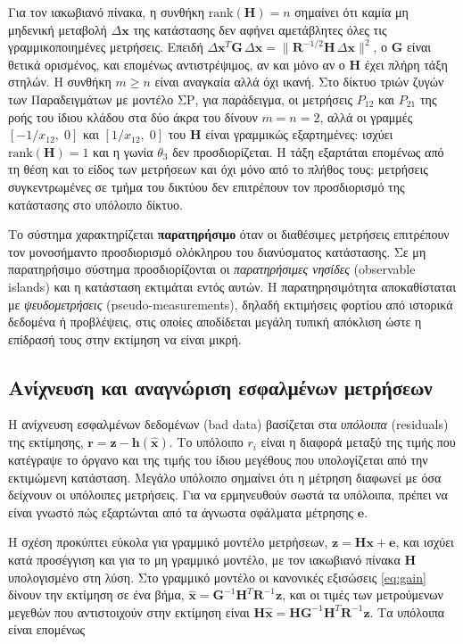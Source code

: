 Για τον ιακωβιανό πίνακα, η συνθήκη $\mathrm{rank}(\mathbf{H}) = n$ σημαίνει ότι καμία μη μηδενική
μεταβολή $\Delta\mathbf{x}$ της κατάστασης δεν αφήνει αμετάβλητες όλες τις γραμμικοποιημένες
μετρήσεις. Επειδή
$\Delta\mathbf{x}^{T}\mathbf{G}\,\Delta\mathbf{x} = \|\mathbf{R}^{-1/2}\mathbf{H}\,\Delta\mathbf{x}\|^{2}$,
ο $\mathbf{G}$ είναι θετικά ορισμένος, και επομένως αντιστρέψιμος, αν και μόνο αν ο
$\mathbf{H}$ έχει πλήρη τάξη στηλών. Η συνθήκη $m \ge n$ είναι αναγκαία αλλά όχι ικανή. Στο
δίκτυο τριών ζυγών των Παραδειγμάτων με μοντέλο ΣΡ, για παράδειγμα, οι μετρήσεις $P_{12}$ και
$P_{21}$ της ροής του ίδιου κλάδου στα δύο άκρα του δίνουν $m = n = 2$, αλλά οι γραμμές
$[-1/x_{12},\; 0]$ και $[1/x_{12},\; 0]$ του $\mathbf{H}$ είναι γραμμικώς εξαρτημένες: ισχύει
$\mathrm{rank}(\mathbf{H}) = 1$ και η γωνία $\theta_3$ δεν προσδιορίζεται. Η τάξη εξαρτάται
επομένως από τη θέση και το είδος των μετρήσεων και όχι μόνο από το πλήθος τους: μετρήσεις
συγκεντρωμένες σε τμήμα του δικτύου δεν επιτρέπουν τον προσδιορισμό της κατάστασης στο
υπόλοιπο δίκτυο.

Το σύστημα χαρακτηρίζεται \textbf{παρατηρήσιμο} όταν οι διαθέσιμες μετρήσεις επιτρέπουν τον
μονοσήμαντο προσδιορισμό ολόκληρου του διανύσματος κατάστασης. Σε μη παρατηρήσιμο σύστημα προσδιορίζονται οι
\emph{παρατηρήσιμες νησίδες} (observable islands) και η κατάσταση εκτιμάται εντός αυτών. Η
παρατηρησιμότητα αποκαθίσταται με \emph{ψευδομετρήσεις} (pseudo-measurements), δηλαδή
εκτιμήσεις φορτίου από ιστορικά δεδομένα ή προβλέψεις, στις οποίες αποδίδεται μεγάλη τυπική
απόκλιση ώστε η επίδρασή τους στην εκτίμηση να είναι μικρή.

\subsection{Ανίχνευση και αναγνώριση εσφαλμένων μετρήσεων}
\label{sec:baddata}

Η ανίχνευση εσφαλμένων δεδομένων (bad data) βασίζεται στα \emph{υπόλοιπα} (residuals) της
εκτίμησης, $\mathbf{r} = \mathbf{z}-\mathbf{h}(\hat{\mathbf{x}})$. Το υπόλοιπο $r_i$ είναι η
διαφορά μεταξύ της τιμής που κατέγραψε το όργανο και της τιμής του ίδιου μεγέθους που
υπολογίζεται από την εκτιμώμενη κατάσταση. Μεγάλο υπόλοιπο σημαίνει ότι η μέτρηση διαφωνεί με
όσα δείχνουν οι υπόλοιπες μετρήσεις. Για να ερμηνευθούν σωστά τα υπόλοιπα, πρέπει να είναι
γνωστό πώς εξαρτώνται από τα άγνωστα σφάλματα μέτρησης $\mathbf{e}$.

Η σχέση προκύπτει εύκολα για γραμμικό μοντέλο μετρήσεων, $\mathbf{z} = \mathbf{H}\mathbf{x} +
\mathbf{e}$, και ισχύει κατά προσέγγιση και για το μη γραμμικό μοντέλο, με τον ιακωβιανό πίνακα
$\mathbf{H}$ υπολογισμένο στη λύση. Στο γραμμικό μοντέλο οι κανονικές εξισώσεις
\eqref{eq:gain} δίνουν την εκτίμηση σε ένα βήμα,
$\hat{\mathbf{x}} = \mathbf{G}^{-1}\mathbf{H}^{T}\mathbf{R}^{-1}\mathbf{z}$, και οι τιμές των
μετρούμενων μεγεθών που αντιστοιχούν στην εκτίμηση είναι
$\mathbf{H}\hat{\mathbf{x}} = \mathbf{H}\mathbf{G}^{-1}\mathbf{H}^{T}\mathbf{R}^{-1}\mathbf{z}$.
Τα υπόλοιπα είναι επομένως

